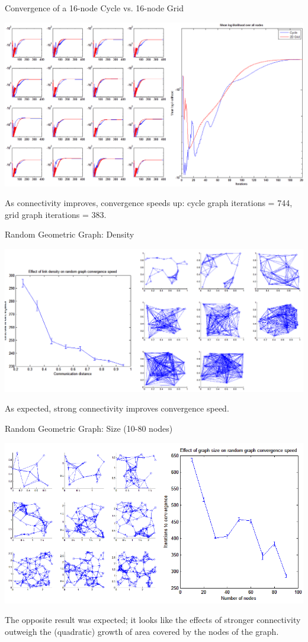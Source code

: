 \documentclass{beamer}
\begin{document}
	\begin{frame}{Convergence of a 16-node Cycle vs. 16-node Grid}
		\centerline{\includegraphics[width=\textwidth]{grid-vs-cycle-ll-per-node.png}}
		As connectivity improves, convergence speeds up: cycle graph iterations = 744, grid graph iterations = 383.
	\end{frame}
	
	\begin{frame}{Random Geometric Graph: Density}
		\centerline{\includegraphics[width=\textwidth]{density_vs_conv.png}}
		As expected, strong connectivity improves convergence speed.
	\end{frame}	

	\begin{frame}{Random Geometric Graph: Size (10-80 nodes)}
		\centerline{\includegraphics[width=\textwidth]{size_vs_conv.png}}
		The opposite result was expected; it looks like the effects of stronger connectivity
		outweigh the (quadratic) growth of area covered by the nodes of the graph.
	\end{frame}	
	
\end{document}
